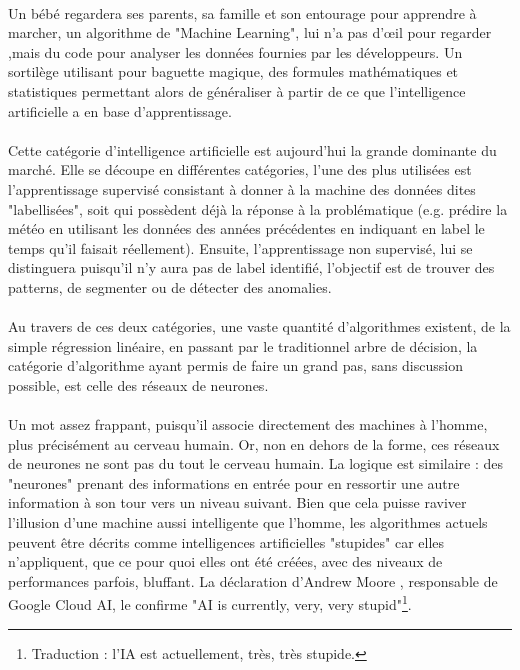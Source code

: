 \documentclass[10pt, french, a4paper]{article}
\begin{document}
\paragraph{}
Un bébé regardera ses parents, sa famille et son entourage pour apprendre à marcher, un algorithme de "Machine Learning", lui n’a pas d’œil pour regarder ,mais du code pour analyser les données fournies par les développeurs. Un sortilège utilisant pour baguette magique, des formules mathématiques et statistiques permettant alors de généraliser à partir de ce que l’intelligence artificielle a en base d’apprentissage.

\paragraph{}
Cette catégorie d’intelligence artificielle est aujourd’hui la grande dominante du marché. Elle se découpe en différentes catégories, l’une des plus utilisées est l’apprentissage supervisé consistant à donner à la machine des données dites "labellisées", soit qui possèdent déjà la réponse à la problématique (e.g. prédire la météo en utilisant les données des années précédentes en indiquant en label le temps qu’il faisait réellement). Ensuite, l’apprentissage non supervisé, lui se distinguera puisqu’il n’y aura pas de label identifié, l’objectif est de trouver des patterns, de segmenter ou de détecter des anomalies.

\paragraph{}
Au travers de ces deux catégories, une vaste quantité d’algorithmes existent, de la simple régression linéaire, en passant par le traditionnel arbre de décision, la catégorie d’algorithme ayant permis de faire un grand pas, sans discussion possible, est celle des réseaux de neurones.

\paragraph{}
Un mot assez frappant, puisqu’il associe directement des machines à l’homme, plus précisément au cerveau humain. Or, non en dehors de la forme, ces réseaux de neurones ne sont pas du tout le cerveau humain. La logique est similaire : des "neurones" prenant des informations en entrée pour en ressortir une autre information à son tour vers un niveau suivant. Bien que cela puisse raviver l’illusion d’une machine aussi intelligente que l’homme, les algorithmes actuels peuvent être décrits comme intelligences artificielles "stupides" car elles n’appliquent, que ce pour quoi elles ont été créées, avec des niveaux de performances parfois, bluffant. La déclaration d’Andrew Moore \citep{newsflash_ai_2018}, responsable de Google Cloud AI, le confirme "AI is currently, very, very stupid"\footnote{Traduction : l’IA est actuellement, très, très stupide.}.
\end{document}
